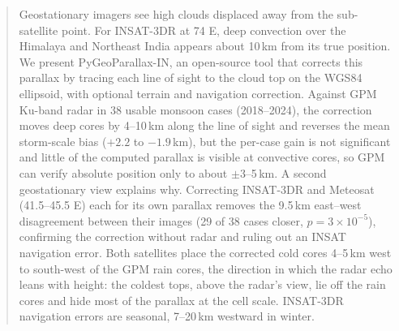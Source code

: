 \begin{abstract}
Geostationary imagers see high clouds displaced away from the sub-satellite point. For INSAT-3DR at 74\,\textdegree\,E, deep convection over the Himalaya and Northeast India appears about 10\,km from its true position. We present PyGeoParallax-IN, an open-source tool that corrects this parallax by tracing each line of sight to the cloud top on the WGS84 ellipsoid, with optional terrain and navigation correction. Against GPM Ku-band radar in 38 usable monsoon cases (2018--2024), the correction moves deep cores by 4--10\,km along the line of sight and reverses the mean storm-scale bias ($+2.2$ to $-1.9$\,km), but the per-case gain is not significant and little of the computed parallax is visible at convective cores, so GPM can verify absolute position only to about $\pm$3--5\,km. A second geostationary view explains why. Correcting INSAT-3DR and Meteosat (41.5--45.5\,\textdegree\,E) each for its own parallax removes the 9.5\,km east--west disagreement between their images (29 of 38 cases closer, $p=3\times10^{-5}$), confirming the correction without radar and ruling out an INSAT navigation error. Both satellites place the corrected cold cores 4--5\,km west to south-west of the GPM rain cores, the direction in which the radar echo leans with height: the coldest tops, above the radar's view, lie off the rain cores and hide most of the parallax at the cell scale. INSAT-3DR navigation errors are seasonal, 7--20\,km westward in winter.
\end{abstract}
